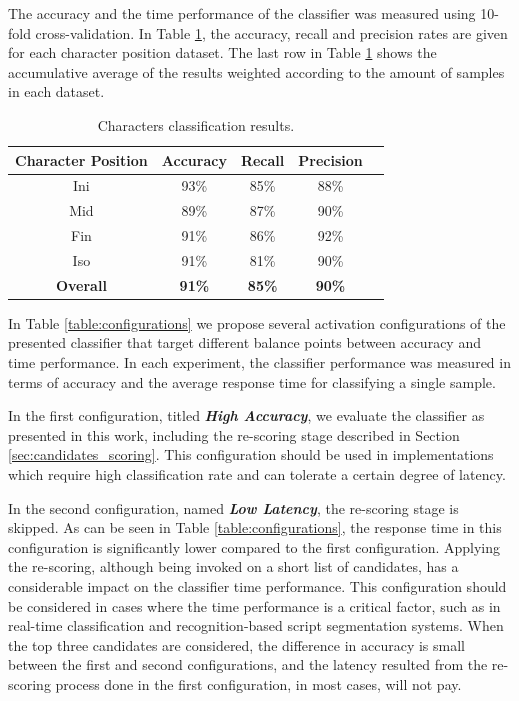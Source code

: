 The accuracy and the time performance of the classifier was measured using 10-fold cross-validation.
In Table \ref{table:results_position}, the accuracy, recall and precision rates are given for each character position dataset.
The last row in Table \ref{table:results_position} shows the accumulative average of the results weighted according to the amount of samples in each dataset.

\begin{table}
\centering
\caption{Characters classification results.}
\renewcommand{\arraystretch}{1.2}
\begin{tabular}{c c c c c}
\toprule
	\textbf{Character Position} & \textbf{Accuracy} & \textbf{Recall} &  \textbf{Precision} \\
	\midrule
	Ini & 93\% & 85\% & 88\% \\                
  	Mid & 89\% & 87\% & 90\% \\
  	Fin & 91\% &  86\% & 92\% \\
  	Iso & 91\% &  81\% & 90\% \\
  	\midrule
  	\textbf{Overall} & \textbf{91\%} &  \textbf{85\%} & \textbf{90\%} \\
  	\bottomrule
\end{tabular}
\label{table:results_position} 
\end{table}

In Table \ref{table:configurations} we propose several activation configurations of the presented classifier that target different balance points between accuracy and time performance.
In each experiment, the classifier performance was measured in terms of accuracy and the average response time for classifying a single sample.

In the first configuration, titled \textbf{\emph{High Accuracy}}, we evaluate the classifier as presented in this work, including the re-scoring stage described in Section \ref{sec:candidates_scoring}.
This configuration should be used in implementations which require high classification rate and can tolerate a certain degree of latency.

In the second configuration, named \textbf{\emph{Low Latency}}, the re-scoring stage is skipped.
As can be seen in Table \ref{table:configurations}, the response time in this configuration is significantly lower compared to the first configuration.
Applying the re-scoring, although being invoked on a short list of candidates, has a considerable impact on the classifier time performance. 
This configuration should be considered in cases where the time performance is a critical factor, such as in real-time classification and recognition-based script segmentation systems.
When the top three candidates are considered, the difference in accuracy is small between the first and second configurations, and the latency resulted from the re-scoring process done in the first configuration, in most cases, will not pay. 

